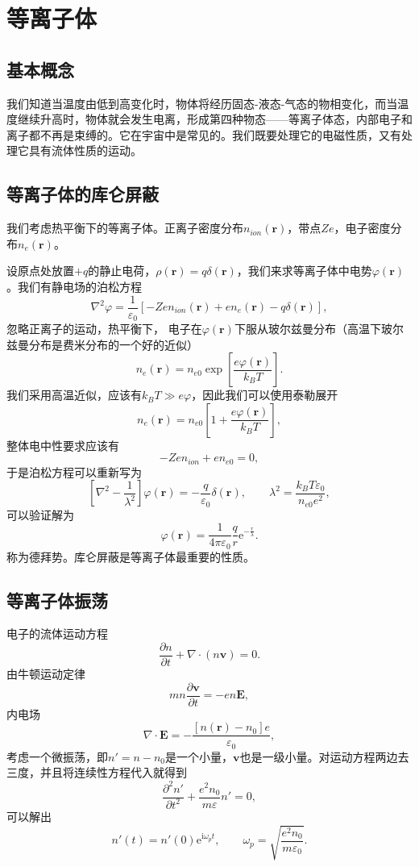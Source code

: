 \documentclass[UTF8]{ctexbook}
\newcommand{\e}{\mathrm{e}}
\renewcommand{\b}{\boldsymbol}
\renewcommand{\i}{\mathrm{i}}
\renewcommand{\k}{\frac{1}{4\pi\varepsilon_0}}
\numberwithin{equation}{chapter}
\begin{document}
	
	\section{等离子体}
	\subsection{基本概念}
	我们知道当温度由低到高变化时，物体将经历固态-液态-气态的物相变化，而当温度继续升高时，物体就会发生电离，形成第四种物态——等离子体态，内部电子和离子都不再是束缚的。它在宇宙中是常见的。我们既要处理它的电磁性质，又有处理它具有流体性质的运动。
	
	\subsection{等离子体的库仑屏蔽}
	我们考虑热平衡下的等离子体。正离子密度分布$n_{ion}(\b{r})$，带点$Ze$，电子密度分布$n_e(\b{r})$。
	
	设原点处放置$+q$的静止电荷，$\rho(\b{r})=q\delta(\b{r})$，我们来求等离子体中电势$\varphi(\b{r})$。我们有静电场的泊松方程
	\[\nabla^2\varphi=\frac{1}{\varepsilon_0}[-Zen_{ion}(\b{r})+en_e(\b{r})-q\delta(\b{r})],\]
	忽略正离子的运动，热平衡下， 电子在$\varphi(\b{r})$下服从玻尔兹曼分布（高温下玻尔兹曼分布是费米分布的一个好的近似）
	\[n_e(\b{r})=n_{e0}\exp\left[\frac{e\varphi(\b{r})}{k_BT}\right].\]
	我们采用高温近似，应该有$k_BT\gg e\varphi$，因此我们可以使用泰勒展开
	\[n_e(\b{r})=n_{e0}\left[1+\frac{e\varphi(\b{r})}{k_BT}\right],\]
	整体电中性要求应该有
	\[-Zen_{ion}+en_{e0}=0,\]
	于是泊松方程可以重新写为
	\[\left[\nabla^2-\frac{1}{\lambda^2}\right]\varphi(\b{r})=-\frac{q}{\varepsilon_0}\delta(\b{r}),\qquad \lambda^2=\frac{k_BT\varepsilon_0}{n_{e0}e^2},\]
	可以验证解为
	\[\varphi(\b{r})=\k\frac{q}{r}\e^{-\frac{r}{\lambda}}.\]
	称为德拜势。库仑屏蔽是等离子体最重要的性质。
	
	\subsection{等离子体振荡}
	电子的流体运动方程
	\[\frac{\partial n}{\partial t}+\nabla\cdot(n\b{v})=0.\]
	由牛顿运动定律
	\[mn\frac{\partial \b{v}}{\partial t}=-en\b{E},\]
	内电场
	\[\nabla\cdot\b{E}=-\frac{[n(\b{r})-n_0]e}{\varepsilon_0},\]
	考虑一个微振荡，即$n'=n-n_0$是一个小量，$\b{v}$也是一级小量。对运动方程两边去三度，并且将连续性方程代入就得到
	\[\frac{\partial^2 n'}{\partial t^2}+\frac{e^2n_0}{m\varepsilon}n'=0,\]
	可以解出
	\[n'(t)=n'(0)\e^{\i\omega_p t},\qquad \omega_p=\sqrt{\frac{e^2 n_0}{m\varepsilon_0}}.\]
	
\end{document}
